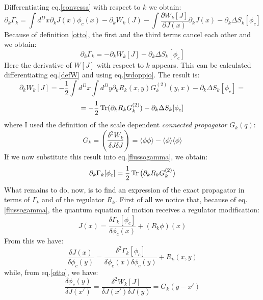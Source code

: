 Differentiating eq.\eqref{convessa} with respect to $k$ we obtain:
\begin{equation*}
 \partial_k \Gamma_k= \int d^D x\partial_kJ(x)\phi_c(x)- \partial_kW_k(J) - \int\frac{\partial W_k[J]}{\partial J(x)}\partial_kJ(x) - \partial_k \Delta S_k[\phi_c]
\end{equation*}
Because of definition \eqref{otto}, the first and the third terms cancel each other and we obtain:
\begin{equation}\label{flussogamma}
 \partial_k \Gamma_k= - \partial_kW_k[J] - \partial_k \Delta S_k[\phi_c]
\end{equation}
Here the derivative of $W[J]$ with respect to $k$ appears. This can be calculated differentiating eq.\eqref{defW} and using eq.\eqref{wdoppio}. The result is:
\begin{equation*}
 \partial_k W_k[J] = -\frac{1}{2}\int d^Dx \int d^Dy\partial_kR_k(x, y)G^{(2)}_k(y,x) - \partial_k\Delta S_k[\phi_c] =
\end{equation*}
\begin{equation}
 = - \frac{1}{2}\operatorname{Tr}(\partial_kR_kG_k^{(2)}) - \partial_k\Delta S_k[\phi_c] 
\end{equation}
where I used the definition of the scale dependent \emph{connected propagator} $G_k(q)$:
\begin{equation}
 G_k = \left( \frac{\delta^2 W_k}{\delta J \delta J}  \right)  =  \langle \phi\phi\rangle -  \langle \phi\rangle \langle\phi\rangle
\end{equation}
If we now substitute this result into eq.\eqref{flussogamma}, we obtain:
\begin{equation}
\partial_k\Gamma_k[\phi_c] = \frac{1}{2}\operatorname{Tr}\big(\partial_kR_kG_k^{(2)}\big)
\end{equation}
What remains to do, now, is to find an expression of the exact propagator in terms of $\Gamma_k$ and of the regulator $R_k$. First of all we notice that, 
because of eq.\eqref{flussogamma}, the quantum equation of motion receives a regulator modification:
\begin{equation}
 J(x) = \frac{\delta\Gamma_k[\phi_c]}{\delta\phi_c(x)} + (R_k\phi)(x)
\end{equation}
From this we have:
\begin{equation}
 \frac{\delta J(x)}{\delta\phi_c(y)} = \frac{\delta^2\Gamma_k[\phi_c]}{\delta\phi_c(x)\delta\phi_c(y)} + R_k(x,y)
\end{equation}
while, from eq.\eqref{otto}, we have:
\begin{equation}
 \frac{\delta\phi_c(y)}{\delta J(x')} = \frac{\delta^2W_k[J]}{\delta J(x')\delta J(y)} = G_k(y-x')
\end{equation}
